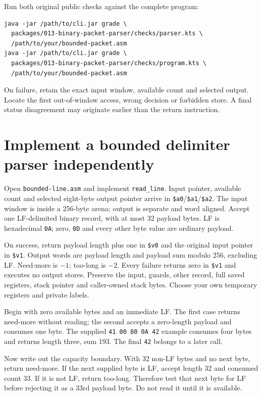Run both original public checks against the complete program:
\begin{verbatim}
java -jar /path/to/cli.jar grade \
  packages/013-binary-packet-parser/checks/parser.kts \
  /path/to/your/bounded-packet.asm
java -jar /path/to/cli.jar grade \
  packages/013-binary-packet-parser/checks/program.kts \
  /path/to/your/bounded-packet.asm
\end{verbatim}
On failure, retain the exact input window, available count and selected output.
Locate the first out-of-window access, wrong decision or forbidden store. A final
status disagreement may originate earlier than the return instruction.

\section{Implement a bounded delimiter parser independently}

Open \texttt{bounded-line.asm} and implement \texttt{read\_line}. Input pointer,
available count and selected eight-byte output pointer arrive in
\texttt{\$a0}/\texttt{\$a1}/\texttt{\$a2}. The input window is inside a 256-byte
arena; output is separate and word aligned. Accept one LF-delimited binary record,
with at most 32 payload bytes. LF is hexadecimal \texttt{0A}; zero, \texttt{0D}
and every other byte value are ordinary payload.

On success, return payload length plus one in \texttt{\$v0} and the original input
pointer in \texttt{\$v1}. Output words are payload length and payload sum modulo
256, excluding LF. Need-more is $-1$; too-long is $-2$. Every failure returns zero
in \texttt{\$v1} and executes no output stores. Preserve the input, guards, other
record, full saved registers, stack pointer and caller-owned stack bytes. Choose
your own temporary registers and private labels.

Begin with zero available bytes and an immediate LF. The first case returns
need-more without reading; the second accepts a zero-length payload and consumes
one byte. The supplied \texttt{41 00 80 0A 42} example consumes four bytes and
returns length three, sum 193. The final \texttt{42} belongs to a later call.

Now write out the capacity boundary. With 32 non-LF bytes and no next byte,
return need-more. If the next supplied byte is LF, accept length 32 and consumed
count 33. If it is not LF, return too-long. Therefore test that next byte for LF
before rejecting it as a 33rd payload byte. Do not read it until it is available.


